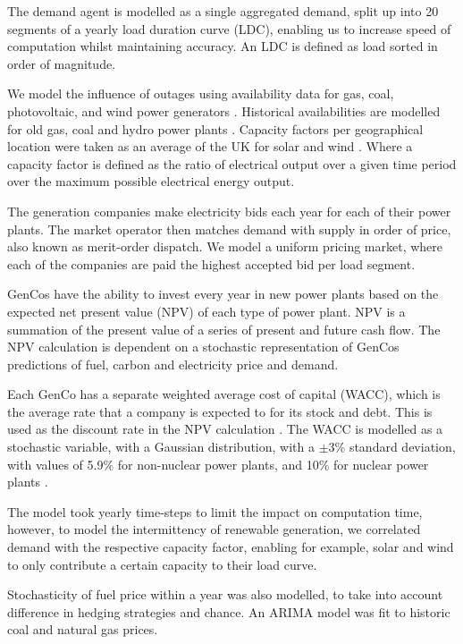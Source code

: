 The demand agent is modelled as a single aggregated demand, split up into 20 segments of a yearly load duration curve (LDC), enabling us to increase speed of computation whilst maintaining accuracy. An LDC is defined as load sorted in order of magnitude. 

We model the influence of outages using availability data for gas, coal, photovoltaic, and wind power generators \cite{Ltd2016, Hunt2015, carroll-j}. Historical availabilities are modelled for old gas, coal and hydro power plants \cite{AlbertaSystemElectricOperator2016}. Capacity factors per geographical location were taken as an average of the UK for solar and wind \cite{Pfenninger2016, Staffell2016}. Where a capacity factor is defined as the ratio of electrical output over a given time period over the maximum possible electrical energy output. 

The generation companies make electricity bids each year for each of their power plants. The market operator then matches demand with supply in order of price, also known as merit-order dispatch. We model a uniform pricing market, where each of the companies are paid the highest accepted bid per load segment.

GenCos have the ability to invest every year in new power plants based on the expected net present value (NPV) of each type of power plant. NPV is a summation of the present value of a series of present and future cash flow. The NPV calculation is dependent on a stochastic representation of GenCos predictions of fuel, carbon and electricity price and demand.

Each GenCo has a separate weighted average cost of capital (WACC), which is the average rate that a company is expected to for its stock and debt. This is used as the discount rate in the NPV calculation \cite{KincheloeStephenC1990TWAC}. The WACC is modelled as a stochastic variable, with a Gaussian distribution, with a $\pm3\%$ standard deviation, with values of 5.9\% for non-nuclear power plants, and 10\% for nuclear power plants \cite{KPMG2017, Paper2012}. 

The model took yearly time-steps to limit the impact on computation time, however, to model the intermittency of renewable generation, we correlated demand with the respective capacity factor, enabling for example, solar and wind to only contribute a certain capacity to their load curve.

Stochasticity of fuel price within a year was also modelled, to take into account difference in hedging strategies and chance. An ARIMA model \cite{ARIMA} was fit to historic coal and natural gas prices.

